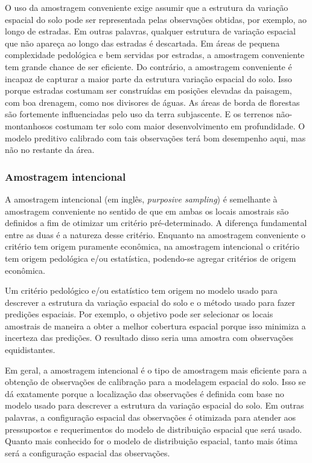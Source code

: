 \documentclass[]{book}
\begin{document}
O uso da amostragem conveniente exige assumir que a estrutura da
variação espacial do solo pode ser representada pelas observações
obtidas, por exemplo, ao longo de estradas. Em outras palavras, qualquer
estrutura de variação espacial que não apareça ao longo das estradas é
descartada. Em áreas de pequena complexidade pedológica e bem servidas
por estradas, a amostragem conveniente tem grande chance de ser
eficiente. Do contrário, a amostragem conveniente é incapaz de capturar
a maior parte da estrutura variação espacial do solo. Isso porque
estradas costumam ser construídas em posições elevadas da paisagem, com
boa drenagem, como nos divisores de águas. As áreas de borda de
florestas são fortemente influenciadas pelo uso da terra subjascente. E
os terrenos não-montanhosos costumam ter solo com maior desenvolvimento
em profundidade. O modelo preditivo calibrado com tais observações terá
bom desempenho aqui, mas não no restante da área.

\subsubsection{Amostragem intencional}\label{amostragem-intencional}

A amostragem intencional (em inglês, \emph{purposive sampling}) é
semelhante à amostragem conveniente no sentido de que em ambas os locais
amostrais são definidos a fim de otimizar um critério pré-determinado. A
diferença fundamental entre as duas é a natureza desse critério.
Enquanto na amostragem conveniente o critério tem origem puramente
econômica, na amostragem intencional o critério tem origem pedológica
e/ou estatística, podendo-se agregar critérios de origem econômica.

Um critério pedológico e/ou estatístico tem origem no modelo usado para
descrever a estrutura da variação espacial do solo e o método usado para
fazer predições espaciais. Por exemplo, o objetivo pode ser selecionar
os locais amostrais de maneira a obter a melhor cobertura espacial
porque isso minimiza a incerteza das predições. O resultado disso seria
uma amostra com observações equidistantes.

Em geral, a amostragem intencional é o tipo de amostragem mais eficiente
para a obtenção de observações de calibração para a modelagem espacial
do solo. Isso se dá exatamente porque a localização das observações é
definida com base no modelo usado para descrever a estrutura da variação
espacial do solo. Em outras palavras, a configuração espacial das
observações é otimizada para atender aos pressupostos e requerimentos do
modelo de distribuição espacial que será usado. Quanto mais conhecido
for o modelo de distribuição espacial, tanto mais ótima será a
configuração espacial das observações.
\end{document}
